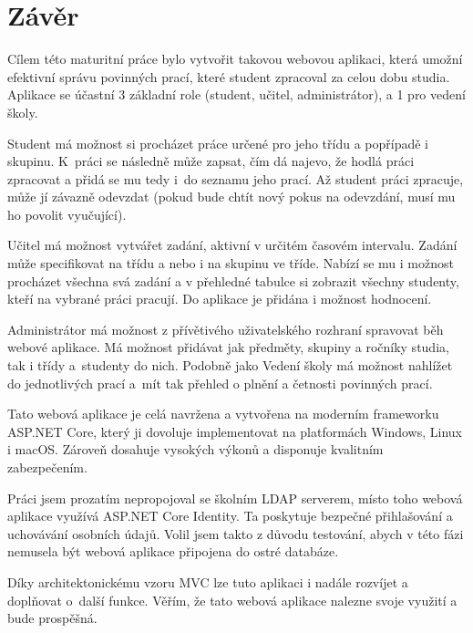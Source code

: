 \documentclass[a4paper, 12pt]{report}
\begin{document}
	\chapter{Závěr}
	Cílem této maturitní práce bylo vytvořit takovou webovou aplikaci, která umožní efektivní správu povinných prací, které student zpracoval za celou dobu studia. Aplikace se účastní 3 základní role (student, učitel, administrátor), a 1 pro vedení školy.\par
	Student má možnost si procházet práce určené pro jeho třídu a popřípadě i skupinu. K~práci se následně může zapsat, čím dá najevo, že hodlá práci zpracovat a přidá se mu tedy i~do seznamu jeho prací. Až student práci zpracuje, může jí závazně odevzdat (pokud bude chtít nový pokus na odevzdání, musí mu ho povolit vyučující).\par
	Učitel má možnost vytvářet zadání, aktivní v určitém časovém intervalu. Zadání může specifikovat na třídu a nebo i na skupinu ve tříde.	Nabízí se mu i možnost procházet všechna svá zadání a v přehledné tabulce si zobrazit všechny studenty, kteří na vybrané práci pracují. Do aplikace je přidána i možnost hodnocení.\par
	Administrátor má možnost z přívětivého uživatelského rozhraní spravovat běh webové aplikace. Má možnost přidávat jak předměty, skupiny a ročníky studia, tak i třídy a~studenty do nich. Podobně jako Vedení školy má možnost nahlížet do jednotlivých prací a~mít tak přehled o plnění a četnosti povinných prací.\par
	Tato webová aplikace je celá navržena a vytvořena na moderním frameworku ASP.NET Core, který ji dovoluje implementovat na platformách Windows, Linux i macOS. Zároveň dosahuje vysokých výkonů a disponuje kvalitním zabezpečením.\par
	Práci jsem prozatím nepropojoval se školním LDAP serverem, místo toho webová aplikace využívá ASP.NET Core Identity. Ta poskytuje bezpečné přihlašování a uchovávání osobních údajů. Volil jsem takto z důvodu testování, abych v této fázi nemusela být webová aplikace připojena do ostré databáze.\par
	Díky architektonickému vzoru MVC lze tuto aplikaci i nadále rozvíjet a doplňovat o~další funkce. Věřím, že tato webová aplikace nalezne svoje využití a bude prospěšná.

	\seznamObrazku

	\renewcommand\listoflistingscaption{Seznam zdrojových kódů}
	\listoflistings


	
	

\end{document}

